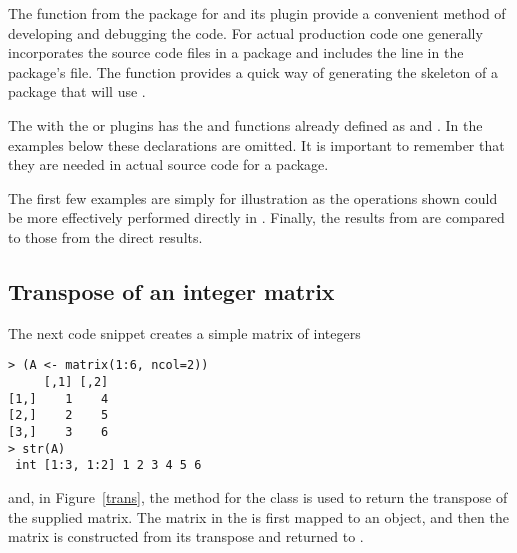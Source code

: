 \documentclass[shortnames,article,nojss]{jss}
\begin{document}
The  function from the  package \citep*{CRAN:inline} for
 and its  plugin provide a convenient method of
developing and debugging the  code.  For actual production code
one generally incorporates the  source code files in a package
and includes the line  in the package's
 file.  The  function
provides a quick way of generating the skeleton of a package that will use
.

The  with the  or 
plugins has the  and  functions already defined as
 and .  In the examples below
these declarations are omitted.  It is important to remember that they are
needed in actual  source code for a package.

The first few examples are simply for illustration as the operations
shown could be more effectively performed directly in .
Finally, the results from  are compared to those from the direct
 results.

\subsection{Transpose of an integer matrix}
\label{sec:transpose}

The next  code snippet creates a simple matrix of integers
\begin{verbatim}
> (A <- matrix(1:6, ncol=2))
     [,1] [,2]
[1,]    1    4
[2,]    2    5
[3,]    3    6
> str(A)
 int [1:3, 1:2] 1 2 3 4 5 6
\end{verbatim}
and, in Figure~\ref{trans}, the  method for the
 class is used to return the transpose of the supplied matrix. The 
matrix in the   is first mapped to an
 object, and then the matrix  is constructed
from its transpose and returned to .
\end{document}
